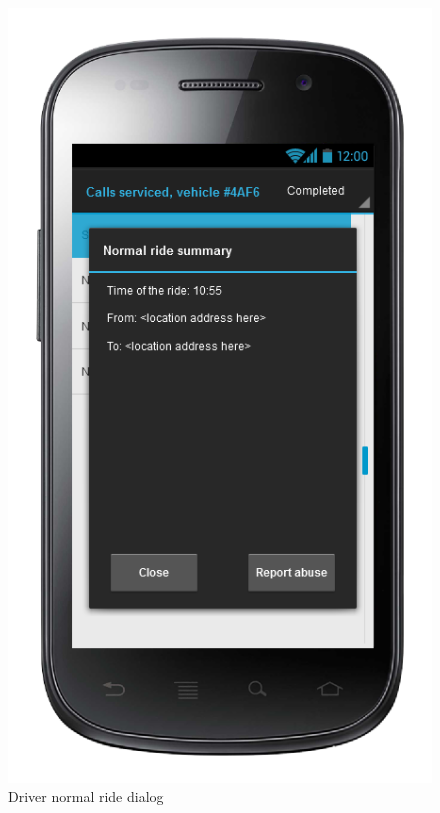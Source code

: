 \begin{figure} [h]
\centering
  	  \includegraphics[scale=0.5]{ui/Driver normal ride dialog.png}
\caption{Driver normal ride dialog}
    
	\end{figure}


